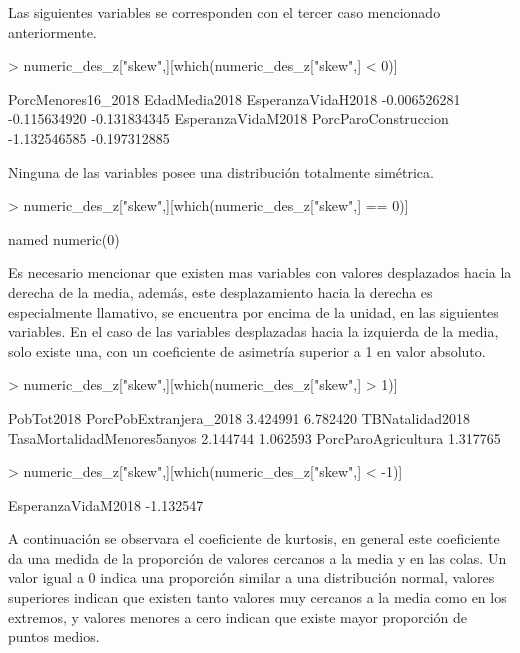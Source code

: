 \documentclass[11pt]{article}
\begin{document}
Las siguientes variables se corresponden con el tercer caso mencionado anteriormente.
\begin{Schunk}
\begin{Sinput}
> numeric_des_z["skew",][which(numeric_des_z["skew",] < 0)]
\end{Sinput}
\begin{Soutput}
  PorcMenores16_2018        EdadMedia2018   EsperanzaVidaH2018 
        -0.006526281         -0.115634920         -0.131834345 
  EsperanzaVidaM2018 PorcParoConstruccion 
        -1.132546585         -0.197312885 
\end{Soutput}
\end{Schunk}
Ninguna de las variables posee una distribución totalmente simétrica.
\begin{Schunk}
\begin{Sinput}
> numeric_des_z["skew",][which(numeric_des_z["skew",] == 0)]
\end{Sinput}
\begin{Soutput}
named numeric(0)
\end{Soutput}
\end{Schunk}
Es necesario mencionar que existen mas variables con valores desplazados hacia la derecha de la media, además, este desplazamiento hacia la derecha es especialmente llamativo, se encuentra por encima de la unidad, en las siguientes variables. En el caso de las variables desplazadas hacia la izquierda de la media, solo existe una, con un coeficiente de asimetría superior a 1 en valor absoluto. 
\begin{Schunk}
\begin{Sinput}
> numeric_des_z["skew",][which(numeric_des_z["skew",] > 1)]
\end{Sinput}
\begin{Soutput}
                 PobTot2018      PorcPobExtranjera_2018 
                   3.424991                    6.782420 
            TBNatalidad2018 TasaMortalidadMenores5anyos 
                   2.144744                    1.062593 
        PorcParoAgricultura 
                   1.317765 
\end{Soutput}
\begin{Sinput}
> numeric_des_z["skew",][which(numeric_des_z["skew",] < -1)]
\end{Sinput}
\begin{Soutput}
EsperanzaVidaM2018 
         -1.132547 
\end{Soutput}
\end{Schunk}
A continuación se observara el coeficiente de kurtosis, en general este coeficiente da una medida de la proporción de valores cercanos a la media y en las colas. Un valor igual a 0 indica una proporción similar a una distribución normal, valores superiores indican que existen tanto valores muy cercanos a la media como en los extremos, y valores menores a cero indican que existe mayor proporción de puntos medios. 
\end{document}
